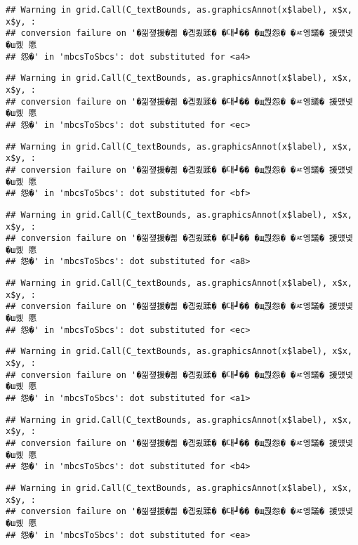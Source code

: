 \documentclass[
]{article}
\begin{document}
\begin{verbatim}
## Warning in grid.Call(C_textBounds, as.graphicsAnnot(x$label), x$x, x$y, :
## conversion failure on '�낆쟾援�쁾 �곕룄蹂� �대┛�� �щ쭩怨� �ㅼ엥議� 援먰넻�ш퀬 愿
## 怨�' in 'mbcsToSbcs': dot substituted for <a4>
\end{verbatim}

\begin{verbatim}
## Warning in grid.Call(C_textBounds, as.graphicsAnnot(x$label), x$x, x$y, :
## conversion failure on '�낆쟾援�쁾 �곕룄蹂� �대┛�� �щ쭩怨� �ㅼ엥議� 援먰넻�ш퀬 愿
## 怨�' in 'mbcsToSbcs': dot substituted for <ec>
\end{verbatim}

\begin{verbatim}
## Warning in grid.Call(C_textBounds, as.graphicsAnnot(x$label), x$x, x$y, :
## conversion failure on '�낆쟾援�쁾 �곕룄蹂� �대┛�� �щ쭩怨� �ㅼ엥議� 援먰넻�ш퀬 愿
## 怨�' in 'mbcsToSbcs': dot substituted for <bf>
\end{verbatim}

\begin{verbatim}
## Warning in grid.Call(C_textBounds, as.graphicsAnnot(x$label), x$x, x$y, :
## conversion failure on '�낆쟾援�쁾 �곕룄蹂� �대┛�� �щ쭩怨� �ㅼ엥議� 援먰넻�ш퀬 愿
## 怨�' in 'mbcsToSbcs': dot substituted for <a8>
\end{verbatim}

\begin{verbatim}
## Warning in grid.Call(C_textBounds, as.graphicsAnnot(x$label), x$x, x$y, :
## conversion failure on '�낆쟾援�쁾 �곕룄蹂� �대┛�� �щ쭩怨� �ㅼ엥議� 援먰넻�ш퀬 愿
## 怨�' in 'mbcsToSbcs': dot substituted for <ec>
\end{verbatim}

\begin{verbatim}
## Warning in grid.Call(C_textBounds, as.graphicsAnnot(x$label), x$x, x$y, :
## conversion failure on '�낆쟾援�쁾 �곕룄蹂� �대┛�� �щ쭩怨� �ㅼ엥議� 援먰넻�ш퀬 愿
## 怨�' in 'mbcsToSbcs': dot substituted for <a1>
\end{verbatim}

\begin{verbatim}
## Warning in grid.Call(C_textBounds, as.graphicsAnnot(x$label), x$x, x$y, :
## conversion failure on '�낆쟾援�쁾 �곕룄蹂� �대┛�� �щ쭩怨� �ㅼ엥議� 援먰넻�ш퀬 愿
## 怨�' in 'mbcsToSbcs': dot substituted for <b4>
\end{verbatim}

\begin{verbatim}
## Warning in grid.Call(C_textBounds, as.graphicsAnnot(x$label), x$x, x$y, :
## conversion failure on '�낆쟾援�쁾 �곕룄蹂� �대┛�� �щ쭩怨� �ㅼ엥議� 援먰넻�ш퀬 愿
## 怨�' in 'mbcsToSbcs': dot substituted for <ea>
\end{verbatim}
\end{document}
